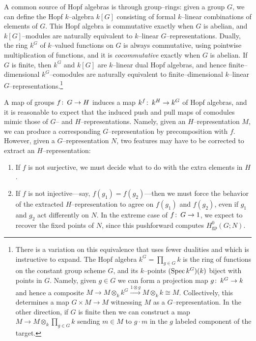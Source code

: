 \begin{example}\label{HopfAlgebrasFromFiniteGroups}
A common source of Hopf algebras is through group--rings: given a group \(G\), we can define the Hopf \(k\)--algebra \(k[G]\) consisting of formal \(k\)--linear combinations of elements of \(G\).  This Hopf algebra is commutative exactly when \(G\) is abelian, and \(k[G]\)--modules are naturally equivalent to \(k\)--linear \(G\)--representations.  Dually, the ring \(k^G\) of \(k\)--valued functions on \(G\) is always commutative, using pointwise multiplication of functions, and it is \emph{cocommutative} exactly when \(G\) is abelian.  If \(G\) is finite, then \(k^G\) and \(k[G]\) are \(k\)--linear dual Hopf algebras, and hence finite--dimensional \(k^G\)--comodules are naturally equivalent to finite--dimensional \(k\)--linear \(G\)--representations.\footnote{There is a variation on this equivalence that uses fewer dualities and which is instructive to expand.  The Hopf algebra \(k^G = \prod_{g \in G} k\) is the ring of functions on the constant group scheme \(G\), and its \(k\)--points \((\operatorname{Spec} k^G)(k)\) biject with points in \(G\).  Namely, given \(g \in G\) we can form a projection map \(g\colon\thinspace k^G \to k\) and hence a composite \(M \to M \otimes_k k^G \xrightarrow{1 \otimes g} M \otimes_k k \cong M\).  Collectively, this determines a map \(G \times M \to M\) witnessing \(M\) as a \(G\)--representation.  In the other direction, if \(G\) is finite then we can construct a map \(M \to M \otimes_k \prod_{g \in G} k\) sending \(m \in M\) to \(g \cdot m\) in the \(g\){\th} labeled component of the target.}

A map of groups \(f\colon\thinspace G \to H\) induces a map \(k^f\colon\thinspace k^H \to k^G\) of Hopf algebras, and it is reasonable to expect that the induced push and pull maps of comodules mimic those of \(G\)-- and \(H\)--representations.  Namely, given an \(H\)--representation \(M\), we can produce a corresponding \(G\)--representation by precomposition with \(f\).  However, given a \(G\)--representation \(N\), two features may have to be corrected to extract an \(H\)--representation:
\begin{enumerate}
\item If \(f\) is not surjective, we must decide what to do with the extra elements in \(H\).
\item If \(f\) is not injective---say, \(f(g_1) = f(g_2)\)---then we must force the behavior of the extracted \(H\)--representation to agree on \(f(g_1)\) and \(f(g_2)\), even if \(g_1\) and \(g_2\) act differently on \(N\).  In the extreme case of \(f\colon\thinspace G \to 1\), we expect to recover the fixed points of \(N\), since this pushforward computes \(H^0_{\mathrm{gp}}(G; N)\).
\end{enumerate}
\end{example}


